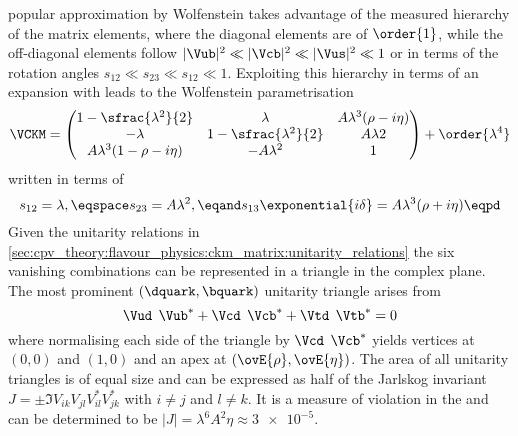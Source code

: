 popular approximation by Wolfenstein \cite{Wolfenstein:1983yz} takes advantage
of the measured hierarchy of the matrix elements, where the diagonal elements
are of $\order{1}$, while the off-diagonal elements follow $\vert\Vub\vert^2 \ll
\vert\Vcb\vert^2 \ll
\vert\Vus\vert^2 \ll 1$ or in terms of the rotation angles $s_{12} \ll s_{23}
\ll s_{12} \ll 1$. Exploiting this hierarchy in terms of an expansion with leads
to the Wolfenstein parametrisation
%
\begin{equation}  
  \VCKM = \begin{pmatrix}
    1 - \sfrac{\lambda^2}{2}        & \lambda                     & A \lambda^3 (\rho - i\eta)  \\
    -\lambda                        & 1 - \sfrac{\lambda^2}{2}    & A \lambda  2                \\
    A \lambda^3 (1 - \rho - i\eta)  & - A \lambda^2               & 1                           \\
  \end{pmatrix}
  + \order{\lambda^4}
\end{equation}
%
written in terms of
%
\begin{equation}
  s_{12} = \lambda, \eqspace s_{23} = A \lambda^2, \eqand s_{13}\exponential{i\delta} = A \lambda^3 (\rho + i \eta) \eqpd
\end{equation}
%
Given the unitarity relations in
\cref{sec:cpv_theory:flavour_physics:ckm_matrix:unitarity_relations} the six
vanishing combinations can be represented in a triangle in the complex plane.
The most prominent ${(\dquark,\bquark)}$ unitarity triangle arises from
%
\begin{equation}
  \Vud^{\phantom{\ast}}\Vub^{\ast} + \Vcd^{\phantom{\ast}}\Vcb^{\ast} + \Vtd^{\phantom{\ast}}\Vtb^{\ast} = 0 
\end{equation}
%
where normalising each side of the triangle by
$\Vcd^{\phantom{\ast}}\Vcb^{\ast}$ yields vertices at ${(0,0)}$ and ${(1,0)}$
and an apex at ${(\ovE{\rho},\ovE{\eta})}$. The area of all unitarity triangles
is of equal size and can be expressed as half of the Jarlskog invariant $J = \pm
\Im V_{ik}^{\phantom{\ast}} V_{jl}^{\phantom{\ast}} V_{il}^{\ast} V_{jk}^{\ast}$
with $i \neq j$ and $l \neq k$. It is a measure of \CP violation in the \SM and
can be determined to be $\vert J \vert = \lambda^6 A^2 \eta \approx \num{3e-5}$.

